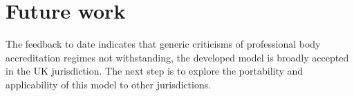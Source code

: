\documentclass[sigconf]{acmart}
\begin{document}
\section{Future work}
The feedback to date indicates that generic criticisms of professional body accreditation regimes not withstanding, the developed model is broadly accepted in the UK jurisdiction. The next step is to explore the portability and applicability of this model to other jurisdictions.  

\begin{comment}


\subsection{Acknowledgements}
Many have contributed to this work: BCS Assessors; visited BCS Education Affiliate HEI's; respondants to surveys; BCS AAC and BCS Accreditation Team.

\end{comment}


%



% 
\end{document}
